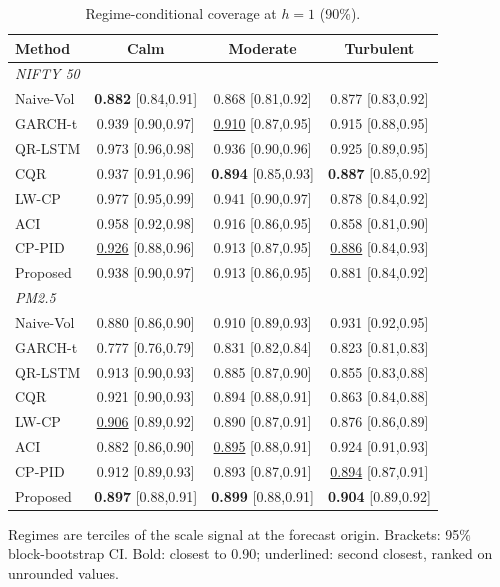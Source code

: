 \begin{table}[!t]\centering\caption{Regime-conditional coverage at $h=1$ (90\%).}\label{tab:regime}
\scriptsize\setlength{\tabcolsep}{2pt}\begin{tabular}{lccc}\toprule
Method & Calm & Moderate & Turbulent\\\midrule
\multicolumn{4}{l}{\textit{NIFTY 50}}\\
Naive-Vol & \textbf{0.882} {\tiny[0.84,0.91]} & 0.868 {\tiny[0.81,0.92]} & 0.877 {\tiny[0.83,0.92]}\\
GARCH-t & 0.939 {\tiny[0.90,0.97]} & \underline{0.910} {\tiny[0.87,0.95]} & 0.915 {\tiny[0.88,0.95]}\\
QR-LSTM & 0.973 {\tiny[0.96,0.98]} & 0.936 {\tiny[0.90,0.96]} & 0.925 {\tiny[0.89,0.95]}\\
CQR & 0.937 {\tiny[0.91,0.96]} & \textbf{0.894} {\tiny[0.85,0.93]} & \textbf{0.887} {\tiny[0.85,0.92]}\\
LW-CP & 0.977 {\tiny[0.95,0.99]} & 0.941 {\tiny[0.90,0.97]} & 0.878 {\tiny[0.84,0.92]}\\
ACI & 0.958 {\tiny[0.92,0.98]} & 0.916 {\tiny[0.86,0.95]} & 0.858 {\tiny[0.81,0.90]}\\
CP-PID & \underline{0.926} {\tiny[0.88,0.96]} & 0.913 {\tiny[0.87,0.95]} & \underline{0.886} {\tiny[0.84,0.93]}\\
Proposed & 0.938 {\tiny[0.90,0.97]} & 0.913 {\tiny[0.86,0.95]} & 0.881 {\tiny[0.84,0.92]}\\
\multicolumn{4}{l}{\textit{PM2.5}}\\
Naive-Vol & 0.880 {\tiny[0.86,0.90]} & 0.910 {\tiny[0.89,0.93]} & 0.931 {\tiny[0.92,0.95]}\\
GARCH-t & 0.777 {\tiny[0.76,0.79]} & 0.831 {\tiny[0.82,0.84]} & 0.823 {\tiny[0.81,0.83]}\\
QR-LSTM & 0.913 {\tiny[0.90,0.93]} & 0.885 {\tiny[0.87,0.90]} & 0.855 {\tiny[0.83,0.88]}\\
CQR & 0.921 {\tiny[0.90,0.93]} & 0.894 {\tiny[0.88,0.91]} & 0.863 {\tiny[0.84,0.88]}\\
LW-CP & \underline{0.906} {\tiny[0.89,0.92]} & 0.890 {\tiny[0.87,0.91]} & 0.876 {\tiny[0.86,0.89]}\\
ACI & 0.882 {\tiny[0.86,0.90]} & \underline{0.895} {\tiny[0.88,0.91]} & 0.924 {\tiny[0.91,0.93]}\\
CP-PID & 0.912 {\tiny[0.89,0.93]} & 0.893 {\tiny[0.87,0.91]} & \underline{0.894} {\tiny[0.87,0.91]}\\
Proposed & \textbf{0.897} {\tiny[0.88,0.91]} & \textbf{0.899} {\tiny[0.88,0.91]} & \textbf{0.904} {\tiny[0.89,0.92]}\\
\bottomrule\end{tabular}
\par\smallskip\parbox{\linewidth}{\scriptsize Regimes are terciles of the scale signal at the forecast origin. Brackets: 95\% block-bootstrap CI. Bold: closest to 0.90; underlined: second closest, ranked on unrounded values.}
\end{table}